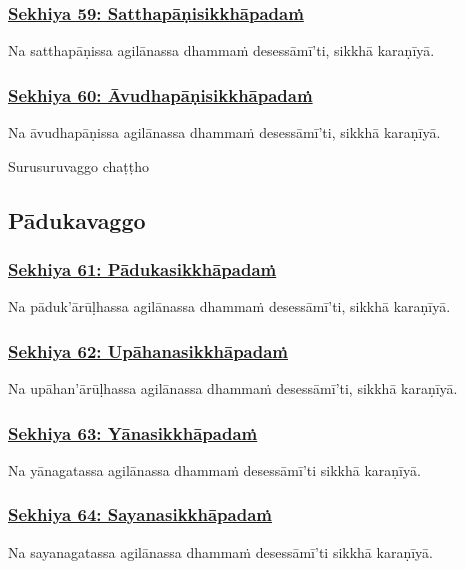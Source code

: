 \subsubsection*{\hyperref[training59]{Sekhiya 59: Satthapāṇisikkhāpadaṁ}}
\label{sekh59}
Na satthapāṇissa agilānassa dhammaṁ desessāmī'ti, sikkhā karaṇīyā.

\subsubsection*{\hyperref[training60]{Sekhiya 60: Āvudhapāṇisikkhāpadaṁ}}
\label{sekh60}
Na āvudhapāṇissa agilānassa dhammaṁ desessāmī'ti, sikkhā karaṇīyā.

\begin{center}
  Surusuruvaggo chaṭṭho
\end{center}

\subsection{Pādukavaggo}
\vspace{0.2cm}

\subsubsection*{\hyperref[training61]{Sekhiya 61: Pādukasikkhāpadaṁ}}
\label{sekh61}
Na pāduk'ārūḷhassa agilānassa dhammaṁ desessāmī'ti, sikkhā karaṇīyā.

\subsubsection*{\hyperref[training62]{Sekhiya 62: Upāhanasikkhāpadaṁ}}
\label{sekh62}
Na upāhan'ārūḷhassa agilānassa dhammaṁ desessāmī'ti, sikkhā karaṇīyā.

\subsubsection*{\hyperref[training63]{Sekhiya 63: Yānasikkhāpadaṁ}}
\label{sekh63}
Na yānagatassa agilānassa dhammaṁ desessāmī'ti sikkhā karaṇīyā.

\subsubsection*{\hyperref[training64]{Sekhiya 64: Sayanasikkhāpadaṁ}}
\label{sekh64}
Na sayanagatassa agilānassa dhammaṁ desessāmī'ti sikkhā karaṇīyā.

